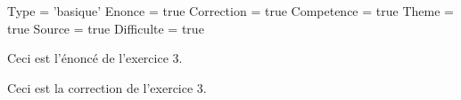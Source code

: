 \documentclass{classe-tex3R}
\begin{document}
\begin{luacode}
  Type = 'basique'
  Enonce = true
  Correction = true
  Competence = true
  Theme = true
  Source = true
  Difficulte = true
\end{luacode}
\parametrage



\begin{enonce}
  Ceci est l'énoncé de l'exercice 3.
\end{enonce}

\begin{correction}
  Ceci est la correction de l'exercice 3.
\end{correction}
\end{document}
